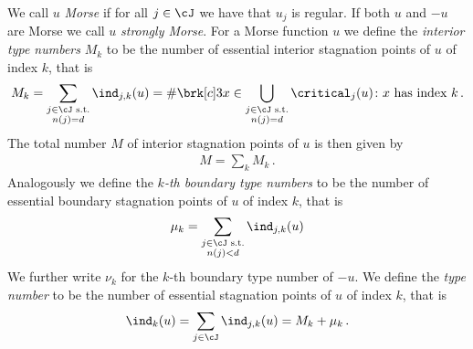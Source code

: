 \begin{definition}
  We call $u$ \emph{Morse} if for all $j\in\cJ$ we have that $u_j$ is regular.
  If both $u$ and $-u$ are Morse we call $u$ \emph{strongly Morse}.
  For a Morse function $u$ we define 
  the \emph{interior type numbers} $M_k$ to be the number of essential interior stagnation points of $u$ of index $k$, that is
  \begin{align}
    M_k=\sum_{\substack{j\in\cJ\text{ s.t.} \\ n(j)=d}}\ind_{j,k}(u)
    =\#\brk[c]3{x\in\bigcup_{\substack{j\in\cJ\text{ s.t.} \\ n(j)=d}}\critical_j(u)\colon x\text{ has index }k}\,.
    \label{eq:def_typenbr_interior}
  \end{align}
  The total number $M$ of interior
  stagnation points of $u$ is then given by
  \begin{align}
    M=\sum_kM_k\,.\label{eq:def_stagnationPtNbr}
  \end{align}
  Analogously we define the \emph{$k$-th boundary type numbers} to be the number of essential boundary 
  stagnation points of $u$ of index $k$, that is
  \begin{align}
    \mu_k=\sum_{\substack{j\in\cJ\text{ s.t.}\\ n(j)<d}}\ind_{j,k}(u)\label{eq:bdTypeNbrs}
  \end{align}
  We further write $\nu_k$ for the $k$-th boundary type number of $-u$.
  We define the \emph{type number} to be the number of
  essential stagnation points of $u$ of index $k$, that is
  \begin{align}
    \ind_k(u)=\sum_{j\in\cJ}\ind_{j,k}(u)=M_k+\mu_k\,.\label{eq:def_typenbr_total}
  \end{align}
\end{definition}

